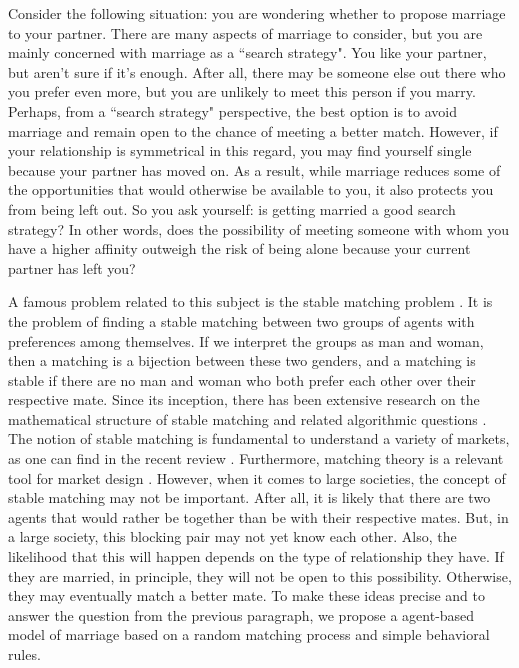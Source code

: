 \documentclass[12pt]{article}
\begin{document}
Consider the following situation: you are wondering whether to propose marriage to your partner. There are many aspects of marriage to consider, but you are mainly concerned with marriage as a ``search strategy". You like your partner, but aren't sure if it's enough. After all, there may be someone else out there who you prefer even more, but you are unlikely to meet this person if you marry. Perhaps, from a ``search strategy" perspective,  the best option is to avoid marriage and remain open to the chance of meeting a better match. However, if your relationship is symmetrical in this regard, you may find yourself single because your partner has moved on. As a result, while marriage reduces some of the opportunities that would otherwise be available to you, it also protects you from being left out. So you ask yourself: is getting married a good search strategy? In other words, does the possibility of meeting someone with whom you have a higher affinity outweigh the risk of being alone because your current partner has left you?

A famous problem related to this subject is the stable matching problem \cite{10.2307/2312726}. It is the problem of finding a stable matching between two groups of agents with preferences among themselves. If we interpret the groups as man and woman, then a matching is a bijection between these two genders, and a matching is stable if there are no man and woman who both prefer each other over their respective mate. Since its inception, there has been extensive research on the mathematical structure of stable matching and related algorithmic questions \cite{10.2307/2312726,knuthstable,gusfield1989stable,roth1992two}. The notion of stable matching is fundamental to understand a variety of markets, as one can find in the recent review \cite{ren2021matching}. Furthermore, matching theory is a relevant tool for market design \cite{article,NBERw29367}. However, when it comes to large societies, the concept of stable matching may not be important. After all, it is likely that there are two agents that would rather be together than be with their respective mates. But, in a large society, this blocking pair may not yet know each other. Also, the likelihood that this will happen depends on the type of relationship they have. If they are married, in principle, they will not be open to this possibility. Otherwise, they may eventually match a better mate. To make these ideas precise and to answer the question from the previous paragraph, we propose a agent-based model of marriage based on a random matching process and simple behavioral rules.
\end{document}
